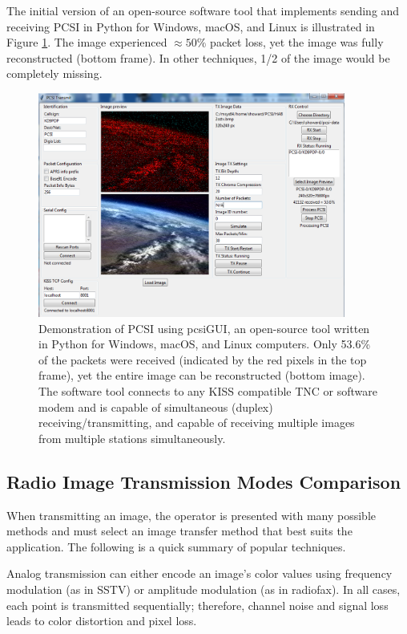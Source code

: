 \documentclass[letterpaper]{article}
\begin{document}
The initial version of an open-source software tool \cite{pcsiwebsite} that implements sending and receiving PCSI in Python for Windows, macOS, and Linux is illustrated in Figure \ref{fig:screenshotl}. The image experienced $\approx 50\%$ packet loss, yet the image was fully reconstructed (bottom frame). In other techniques, 1/2 of the image would be completely missing.

\begin{figure}
    \centering
    \includegraphics[width=0.9\textwidth]{pcsiusage.png}
    \caption{Demonstration of PCSI using pcsiGUI, an open-source tool written in Python for Windows, macOS, and Linux computers. Only 53.6\% of the packets were received (indicated by the red pixels in the top frame), yet the entire image can be reconstructed (bottom image). The software tool connects to any KISS compatible TNC or software modem and is capable of simultaneous (duplex) receiving/transmitting, and capable of receiving multiple images from multiple stations simultaneously.}
    \label{fig:screenshotl}
\end{figure}



\subsection{Radio Image Transmission Modes Comparison}
When transmitting an image, the operator is presented with many possible methods and must select an image transfer method that best suits the application. The following is a quick summary of popular techniques. 

Analog transmission can either encode an image's color values using frequency modulation (as in SSTV) or amplitude modulation (as in radiofax). In all cases, each point is transmitted sequentially; therefore, channel noise and signal loss leads to color distortion and pixel loss.
\end{document}
